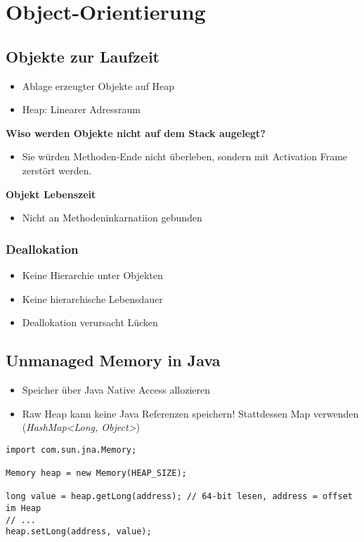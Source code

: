 \section{Object-Orientierung}
\subsection{Objekte zur Laufzeit}
\begin{itemize}
    \item Ablage erzeugter Objekte auf Heap
    \item Heap: Linearer Adressraum
\end{itemize}
\textbf{Wiso werden Objekte nicht auf dem Stack augelegt?}
\begin{itemize}
    \item Sie würden Methoden-Ende nicht überleben, sondern mit Activation Frame zerstört werden.
\end{itemize}
\textbf{Objekt Lebenszeit}
\begin{itemize}
    \item Nicht an Methodeninkarnatiion gebunden
\end{itemize}

\subsubsection{Deallokation}
\begin{itemize}
    \item Keine Hierarchie unter Objekten
    \item Keine hierarchische Lebensdauer
    \item Deallokation verursacht Lücken
\end{itemize}

\subsection{Unmanaged Memory in Java}
\begin{itemize}
    \item Speicher über Java Native Access allozieren
    \item Raw Heap kann keine Java Referenzen speichern! Stattdessen Map verwenden (\textit{HashMap\textless Long, Object\textgreater})
\end{itemize}
\begin{lstlisting}
import com.sun.jna.Memory;

Memory heap = new Memory(HEAP_SIZE);

long value = heap.getLong(address); // 64-bit lesen, address = offset im Heap
// ... 
heap.setLong(address, value);
\end{lstlisting}

